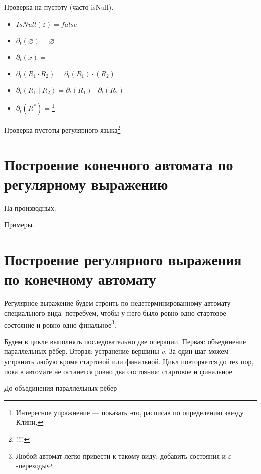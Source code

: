 Проверка на пустоту (часто isNull).

\begin{itemize}
    \item $IsNull(\varepsilon) = false$
    \item $\partial_t(\varnothing) = \varnothing$
    \item $\partial_t(x) = $
    \item $\partial_t(R_1 \cdot R_2) = \partial_t(R_1) \cdot (R_2) \mid $
    \item $\partial_t(R_1 \mid R_2) = \partial_t(R_1) \mid \partial_t(R_2) $
    \item $\partial_t(R^*) = $\footnote{Интересное упражнение --- показать это, расписав по определению звезду Клини.}
\end{itemize}

Проверка пустоты регулярного языка\footnote{!!!!}


\section{Построение конечного автомата по регулярному выражению}
 
На производных.

Примеры.

\section{Построение регулярного выражения по конечному автомату}

Регулярное выражение будем строить по недетерминированному автомату специального вида: потребуем, чтобы у него было ровно одно стартовое состояние и ровно одно финальное\footnote{Любой автомат легко привести к такому виду: добавить состояния и $\varepsilon$-переходы}. 

Будем в цикле выполнять последовательно две операции.
Первая: объединение параллельных рёбер.
Вторая: устранение вершины $v$. За один шаг можем устранить любую кроме стартовой или финальной.
Цикл повторяется до тех пор, пока в автомате не останется ровно два состояния: стартовое и финальное.

До объединения параллельных рёбер

